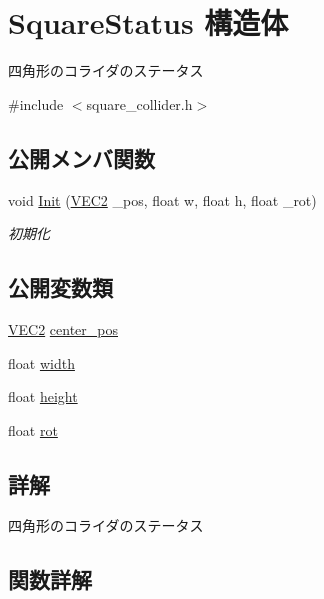 \hypertarget{struct_square_status}{}\section{Square\+Status 構造体}
\label{struct_square_status}


四角形のコライダのステータス  




{\ttfamily \#include $<$square\+\_\+collider.\+h$>$}

\subsection*{公開メンバ関数}
\begin{DoxyCompactItemize}
\item 
void \mbox{\hyperlink{struct_square_status_aebaf41dc23d58bdcf75db7d6a4d413b8}{Init}} (\mbox{\hyperlink{transform_8h_afb0c5e21d4133ff4f200992c0b534e1b}{V\+E\+C2}} \+\_\+pos, float w, float h, float \+\_\+rot)
\begin{DoxyCompactList}\small\item\em 初期化 \end{DoxyCompactList}\end{DoxyCompactItemize}
\subsection*{公開変数類}
\begin{DoxyCompactItemize}
\item 
\mbox{\hyperlink{transform_8h_afb0c5e21d4133ff4f200992c0b534e1b}{V\+E\+C2}} \mbox{\hyperlink{struct_square_status_a596399f78ae068b823330800f1e4ce88}{center\+\_\+pos}}
\item 
float \mbox{\hyperlink{struct_square_status_ad3da51c76a64f335e2401a333ed7a29c}{width}}
\item 
float \mbox{\hyperlink{struct_square_status_a51c69bef860505afe38cd5009fcbae1e}{height}}
\item 
float \mbox{\hyperlink{struct_square_status_aa3a8763adac80250eaaa0f2ed4e33a36}{rot}}
\end{DoxyCompactItemize}


\subsection{詳解}
四角形のコライダのステータス 

\subsection{関数詳解}
\mbox{\label{struct_square_status_aebaf41dc23d58bdcf75db7d6a4d413b8}} 
